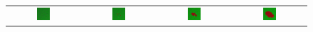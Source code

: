 \begin{figure}[h]
\centering
\mySfFamily
\begin{tabular}{c c c c}
\includegraphics[width = 0.2\textwidth]{../images/predator_prey_f1e6_d1e5.png} & \includegraphics[width = 0.2\textwidth]{../images/../images/predator_prey_f1e6_d1e5_i1.png} & \includegraphics[width = 0.2\textwidth]{../images/../images/predator_prey_f1e6_d1e5_i2.png} & \includegraphics[width = 0.2\textwidth]{../images/../images/predator_prey_f1e6_d1e5_i3.png}\\[2ex]

\end{tabular}
\end{figure}
